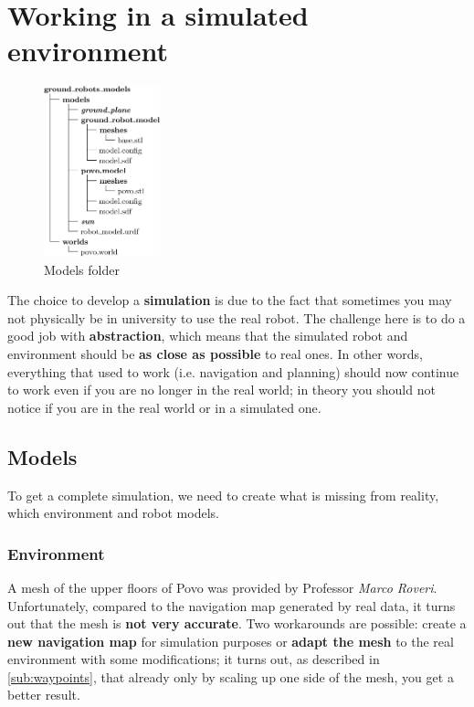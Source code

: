 \chapter{Working in a simulated environment}
\label{cha:simworld}

\noindent\begin{figure}
    \includegraphics[width=0.3\textwidth]{images/models_folder}
    \caption{Models folder}
\end{figure}
The choice to develop a \textbf{simulation} is due to the fact that sometimes you may not physically be in university to use the real robot. The challenge here is to do a good job with \textbf{abstraction}, which means that the simulated robot and environment should be \textbf{as close as possible} to real ones. In other words, everything that used to work (i.e. navigation and planning) should now continue to work even if you are no longer in the real world; in theory you should not notice if you are in the real world or in a simulated one.

\section{Models}

To get a complete simulation, we need to create what is missing from reality, which environment and robot models.

\subsection{Environment}
\label{sub:map}

A mesh of the upper floors of Povo was provided by Professor \textit{Marco Roveri}\cite{roveri}. Unfortunately, compared to the navigation map generated by real data, it turns out that the mesh is \textbf{not very accurate}. Two workarounds are possible: create a \textbf{new navigation map} for simulation purposes or \textbf{adapt the mesh} to the real environment with some modifications; it turns out, as described in \autoref{sub:waypoints}, that already only by scaling up one side of the mesh, you get a better result. 

